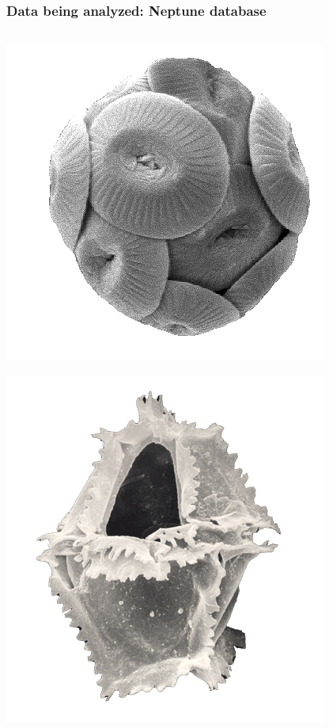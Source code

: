 \documentclass{beamer}
\begin{document}
\begin{frame}
  \frametitle{Data being analyzed: Neptune database}

  \begin{columns}
    \begin{column}{0.1\textwidth}
      \begin{center}
        \includegraphics[width=\textwidth,height=0.15\textheight,keepaspectratio=true]{figure/calc}

        \includegraphics[width=\textwidth,height=0.15\textheight,keepaspectratio=true]{figure/dino}


\end{center}
\end{column}
\end{columns}
\end{frame}
\end{document}
